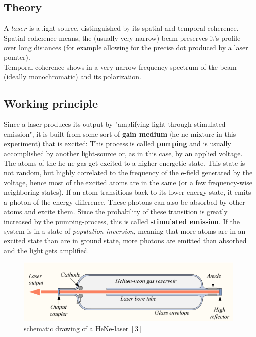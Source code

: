 \documentclass[12pt,a4paper]{article}
\begin{document}
\begin{multicols}{2}
\section{Theory}
A $laser$ is a light source, distinguished by its spatial and temporal coherence.\\
Spatial coherence means, the (usually very narrow) beam preserves it's profile over long distances (for example allowing for the precise dot produced by a laser pointer).\\
Temporal coherence shows in a very narrow frequency-spectrum of the beam (ideally monochromatic) and its polarization.\\

\subsection{Working principle}
\noindent Since a laser produces its output by "amplifying light through stimulated emission", it is built from some sort of \textbf{gain medium} (he-ne-mixture in this experiment) that is excited: This process is called \textbf{pumping} and is usually accomplished by another light-source or, as in this case, by an applied voltage.\\
The atoms of the he-ne-gas get excited to a higher energetic state. This state is not random, but highly correlated to the frequency of the e-field generated by the voltage, hence most of the excited atoms are in the same (or a few frequency-wise neighboring states). If an atom transitions back to its lower energy state, it emits a photon of the energy-difference. These photons can also be absorbed by other atoms and excite them. Since the probability of these transition is greatly increased by the pumping-process, this is called \textbf{stimulated emission}.
If the system is in a state of \textit{population inversion}, meaning that more atoms are in an excited state than are in ground state, more photons are emitted than absorbed and the light gets amplified.\\


\begin{figure}[H]
 \centering
 \includegraphics[scale=0.35]{./figures/HeNe_schematic.png}
 \caption{schematic drawing of a HeNe-laser $[3]$}
 \label{fig:hene-schematic}
\end{figure}


\end{multicols}
\end{document}
